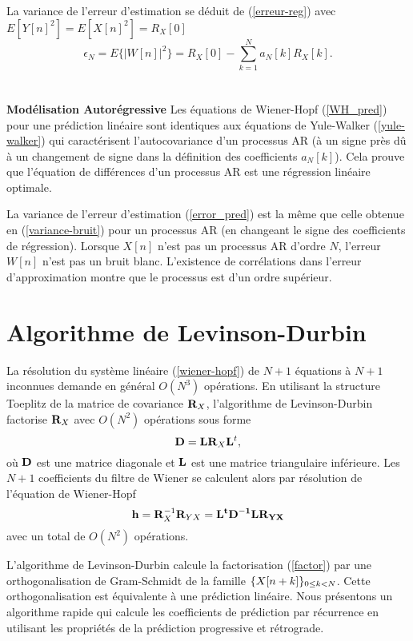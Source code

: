 La variance de l'erreur d'estimation se d\'eduit de 
(\ref{erreur-reg}) avec $E[Y[n]^2 ] = E[X[n]^2 ] = R_X[0]$
\begin{equation}
\label{error_pred}
\epsilon_N = E\{|W [n]|^2\} = 
R_X[0]  - \sum_{k=1}^N a_N[k] R_X[k] .
\end{equation}
\\
\\
{\bf Mod\'elisation Autor\'egressive}
Les \'equations de
Wiener-Hopf (\ref{WH_pred}) pour une pr\'ediction lin\'eaire
sont identiques aux
\'equations de Yule-Walker (\ref{yule-walker})
qui caract\'erisent l'autocovariance
d'un processus AR 
(\`a un signe pr\`es d\^u \`a un changement de signe dans la
d\'efinition des coefficients $a_N [k]$).
Cela prouve que l'\'equation de diff\'erences d'un processus AR est
une r\'egression lin\'eaire optimale.

La variance de l'erreur d'estimation (\ref{error_pred})
est la m\^eme que celle
obtenue en (\ref{variance-bruit}) 
pour un processus AR (en changeant le signe des
coefficients de r\'egression).
Lorsque
$X[n]$ n'est pas un processus AR d'ordre $N$,
l'erreur $W [n]$ n'est pas un bruit blanc.
L'existence de corr\'elations dans l'erreur d'approximation montre
que le processus est d'un ordre sup\'erieur. 

\section{Algorithme de Levinson-Durbin}

La r\'esolution du syst\`eme lin\'eaire (\ref{wiener-hopf}) de $N+1$
\'equations \`a $N+1$ inconnues demande en g\'en\'eral
$O(N^3)$ op\'erations. 
En utilisant la structure Toeplitz de la matrice
de covariance ${\bf{R}}_X$,
l'algorithme de Levinson-Durbin 
factorise ${\bf{R}}_X$ avec $O(N^2)$ op\'erations sous forme
\begin{equation}
\label{factor}
{\bf D} = {\bf L} {\bf{R}}_X {\bf L}^t ,
\end{equation}
o\`u ${\bf D}$ est une matrice diagonale et ${\bf L}$ est une
matrice triangulaire inf\'erieure. 
Les $N+1$ coefficients du filtre de Wiener se calculent
alors par r\'esolution de l'\'equation de Wiener-Hopf
\[
{\bf h} = {\bf R}_X^{-1} {\bf R}_{YX} = \bf L^t \bf D^{-1} \bf L {\bf R}_{YX} 
\]
avec un total de $O(N^2)$ op\'erations.

L'algorithme de Levinson-Durbin calcule la factorisation
(\ref{factor}) par une orthogonalisation de
Gram-Schmidt de la famille $\{X[n+k]\}_{ 0 \leq k < N}$. Cette 
orthogonalisation est \'equivalente \`a une pr\'ediction lin\'eaire.
Nous pr\'esentons un algorithme rapide qui calcule les
coefficients de pr\'ediction par r\'ecurrence en utilisant
les propri\'et\'es de la pr\'ediction progressive et r\'etrograde.

